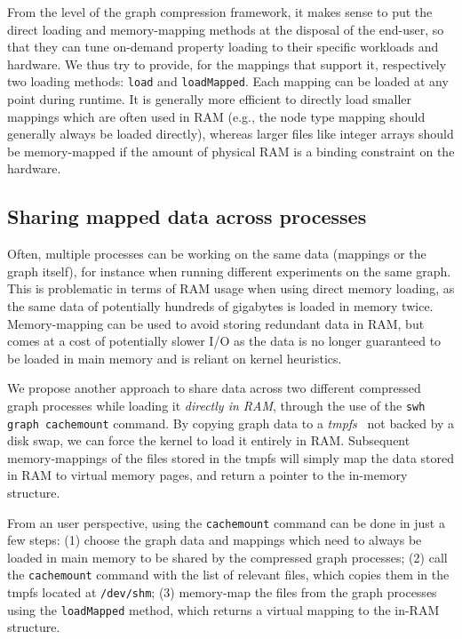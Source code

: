 From the level of the graph compression framework, it makes sense to put the
direct loading and memory-mapping methods at the disposal of the end-user, so
that they can tune on-demand property loading to their specific workloads and
hardware. We thus try to provide, for the mappings that support it,
respectively two loading methods: \texttt{load} and \texttt{loadMapped}.
Each mapping can be loaded at any point during runtime. It is generally more
efficient to directly load smaller mappings which are often used in RAM (e.g.,
the node type mapping should generally always be loaded directly), whereas
larger files like integer arrays should be memory-mapped if the amount of
physical RAM is a binding constraint on the hardware.

\subsection{Sharing mapped data across processes}%
\label{sec:cachemount}

Often, multiple processes can be working on the same data (mappings or the
graph itself), for instance when running different experiments on the same
graph. This is problematic in terms of RAM usage when using direct memory
loading, as the same data of potentially hundreds of gigabytes is loaded in
memory twice. Memory-mapping can be used to avoid storing redundant data in
RAM, but comes at a cost of potentially slower I/O as the data is no longer
guaranteed to be loaded in main memory and is reliant on kernel heuristics.

We propose another approach to share data across two different compressed graph
processes while loading it \emph{directly in RAM}, through the use of the
\texttt{swh graph cachemount} command. By copying graph data to a
\emph{tmpfs}~\cite{snyder1990tmpfs} not backed by a disk swap, we can force the
kernel to load it entirely in RAM. Subsequent memory-mappings of the files
stored in the tmpfs will simply map the data stored in RAM to virtual memory
pages, and return a pointer to the in-memory structure.

From an user perspective, using the \texttt{cachemount} command can be done in
just a few steps: (1) choose the graph data and mappings which need to always
be loaded in main memory to be shared by the compressed graph processes; (2)
call the \texttt{cachemount} command with the list of relevant files, which
copies them in the tmpfs located at \texttt{/dev/shm}; (3) memory-map the files
from the graph processes using the \texttt{loadMapped} method, which returns a
virtual mapping to the in-RAM structure.

